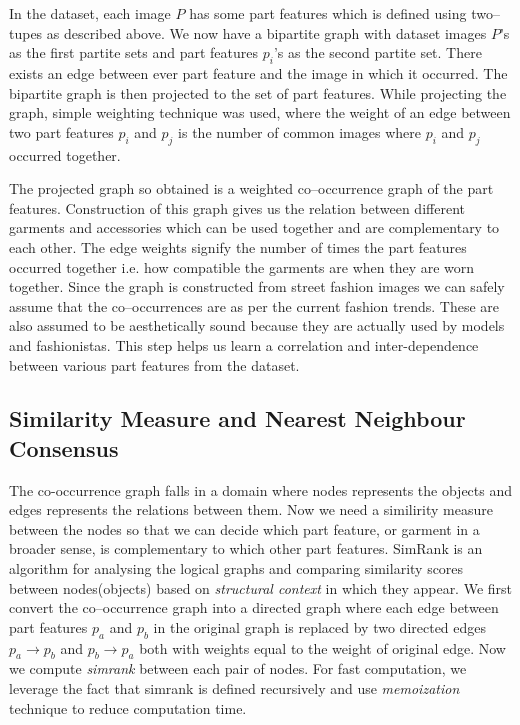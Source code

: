 In the dataset, each image $P$ has some part features which is defined using two--tupes as described above. We now have a bipartite graph with dataset images $P$'s as the first partite sets and part features $p_i$'s as the second partite set. There exists an edge between ever part feature and the image in which it occurred. The bipartite graph is then projected to the set of part features. While projecting the graph, simple weighting technique was used, where the weight of an edge between two part features $p_i$ and $p_j$ is the number of common images where $p_i$ and $p_j$ occurred together.

The projected graph so obtained is a weighted co--occurrence graph of the part features. Construction of this graph gives us the relation between different garments and accessories which can be used together and are complementary to each other. The edge weights signify the number of times the part features occurred together i.e. how compatible the garments are when they are worn together. Since the graph is constructed from street fashion images we can safely assume that the co--occurrences are as per the current fashion trends. These are also assumed to be aesthetically sound because they are actually used by models and fashionistas. This step helps us learn a correlation and inter-dependence between various part features from the dataset.

\subsection{Similarity Measure and Nearest Neighbour Consensus}

The co-occurrence graph falls in a domain where nodes represents the objects and edges represents the relations between them. Now we need a similirity measure between the nodes so that we can decide which part feature, or garment in a broader sense, is complementary to which other part features. SimRank\cite{simrank} is an algorithm for analysing the logical graphs and comparing similarity scores between nodes(objects) based on \textit{structural context} in which they appear. We first convert the co--occurrence graph into a directed graph where each edge between part features $p_a$ and $p_b$ in the original graph is replaced by two directed edges $p_a \rightarrow p_b$ and $p_b \rightarrow p_a$ both with weights equal to the weight of original edge. Now we compute \textit{simrank} between each pair of nodes. For fast computation, we leverage the fact that simrank is defined recursively and use \textit{memoization} technique to reduce computation time.

